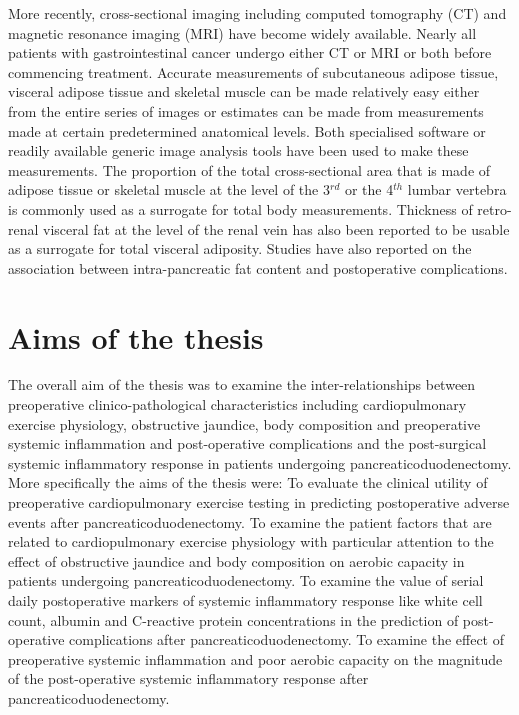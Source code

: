 More recently, cross-sectional imaging including computed tomography (CT) and magnetic resonance imaging (MRI) have become widely available. 
Nearly all patients with gastrointestinal cancer undergo either CT or MRI or both before commencing treatment. 
Accurate measurements of subcutaneous adipose tissue, visceral adipose tissue and skeletal muscle can be made relatively easy either from the entire series of images or estimates can be made from measurements made at certain predetermined anatomical levels. 
Both specialised software or readily available generic image analysis tools have been used to make these measurements. 
The proportion of the total cross-sectional area that is made of adipose tissue or skeletal muscle at the level of the 3$^{rd}$ or the 4$^{th}$ lumbar vertebra is commonly used as a surrogate for total body measurements. 
Thickness of retro-renal visceral fat at the level of the renal vein has also been reported to be usable as a surrogate for total visceral adiposity. 
Studies have also reported on the association between intra-pancreatic fat content and postoperative complications.

\clearpage
\section{Aims of the thesis}
\vfill
The overall aim of the thesis was to examine the inter-relationships between preoperative clinico-pathological characteristics including cardiopulmonary exercise physiology, obstructive jaundice, body composition and preoperative systemic inflammation and post-operative complications and the post-surgical systemic inflammatory response in patients undergoing pancreaticoduodenectomy.
\vfill
More specifically the aims of the thesis were:
\vfill
To evaluate the clinical utility of preoperative cardiopulmonary exercise testing in predicting postoperative adverse events after pancreaticoduodenectomy.
\vfill
To examine the patient factors that are related to cardiopulmonary exercise physiology with particular attention to the effect of obstructive jaundice and body composition on aerobic capacity in patients undergoing pancreaticoduodenectomy.
\vfill
To examine the value of serial daily postoperative markers of systemic inflammatory response like white cell count, albumin 
and C-reactive protein concentrations in the prediction of post-operative complications after pancreaticoduodenectomy.
\vfill
To examine the effect of preoperative systemic inflammation and poor aerobic capacity on the magnitude of the post-operative systemic inflammatory response after pancreaticoduodenectomy.
\vfill

